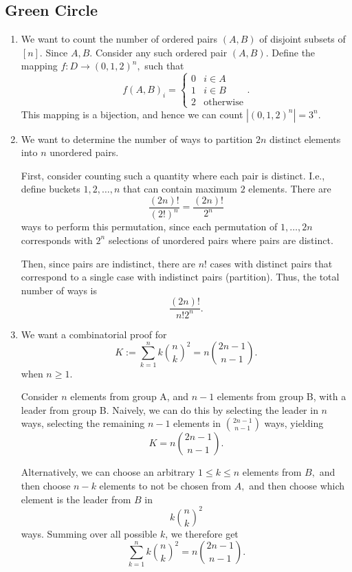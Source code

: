 \documentclass[12pt]{article}
\begin{document}
\subsection{Green Circle}
\begin{enumerate}
  \item [1] We want to count the number of ordered pairs $(A, B)$ of
    disjoint subsets of $[n].$ Since $A, B.$ Consider any such
    ordered pair $(A, B).$ Define the mapping $f: D \to (0, 1,
    2)^{n},$ such that
    $$
    f(A, B)_{i} =
    \begin{cases}
      0 & i \in A  \\
      1 & i \in B \\
      2 & \text{otherwise}
    \end{cases}.
    $$
    This mapping is a bijection, and hence we can count $|(0, 1, 2)^n| = 3^n.$

  \item [4] We want to determine the number of ways to partition $2n$
    distinct elements into $n$ unordered pairs.

    First, consider counting such a quantity where each pair is
    distinct. I.e., define buckets $1, 2, \ldots, n$ that can contain
    maximum $2$ elements. There are
    $$
    \dfrac{(2n)!}{(2!)^{n}} = \dfrac{(2n)!}{2^n}
    $$
    ways to perform this permutation, since each permutation of $1,
    \ldots, 2n$ corresponds with $2^n$ selections of unordered pairs
    where pairs are distinct.

    Then, since pairs are indistinct, there are $n!$ cases with
    distinct pairs that correspond to a single case with indistinct
    pairs (partition). Thus, the total number of ways is
    $$
    \dfrac{(2n)!}{n! 2^n}.
    $$

  \item [5] We want a combinatorial proof for
    $$
    K :=\sum_{k =1 }^{n} k {n \choose k}^2 = n {2n - 1 \choose n - 1}.
    $$
    when $n \geq 1.$

    Consider $n$ elements from group A, and $n - 1$ elements from
    group B, with a leader from group B. Naively, we can do this by
    selecting the leader in $n$ ways, selecting the remaining $n -1$
    elements in ${2n -1 \choose n - 1}$ ways, yielding
    $$
    K = n {2 n -1 \choose n- 1}.
    $$

    Alternatively, we can choose an arbitrary $1 \leq k \leq n$
    elements from $B,$ and then choose $n - k$ elements to not be
    chosen from $A,$ and then choose which element is the leader from $B$ in $$
    k {n \choose k}^2
    $$
    ways. Summing over all possible $k$, we therefore get
    $$
    \sum_{k =1 }^{n} k {n \choose k}^2 = n {2n -1 \choose n - 1}.
    $$
\end{enumerate}
\end{document}
